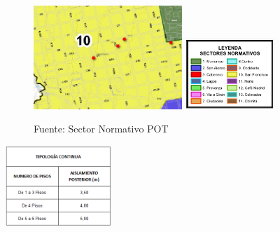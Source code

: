 \documentclass[12pt,a4paper,twoside]{article}
\begin{document}
\begin{figure}[!h]
	\centering
	\includegraphics[width=0.5\textwidth]{Norma/sectornormativo}
	\includegraphics[width=0.3\textwidth]{Norma/sectornormativo1}
	\caption{Fuente: Sector Normativo POT}
	\label{fig:tratamiento}
\end{figure}

\begin{center}
	\includegraphics[width=0.3\textwidth]{Norma/Edificabilidad4}
\end{center}



\begin{center}
\end{center}
\end{document}
